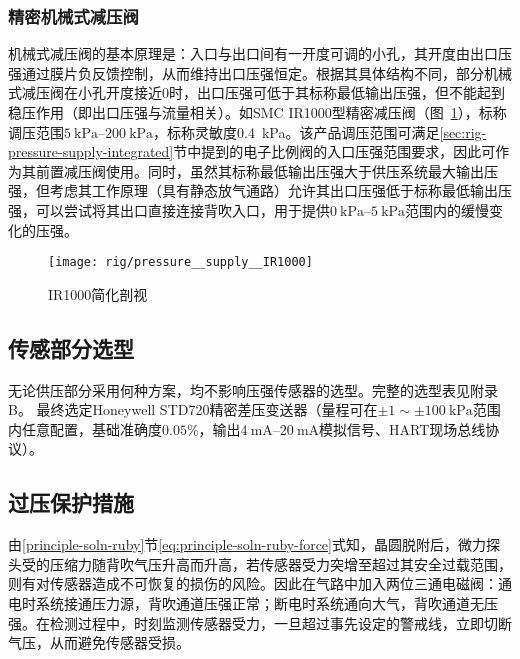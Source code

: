 \subsubsection{精密机械式减压阀}\label{sec:rig-pressure-supply-reg}

机械式减压阀的基本原理是：入口与出口间有一开度可调的小孔，其开度由出口压强通过膜片负反馈控制，从而维持出口压强恒定。根据其具体结构不同，部分机械式减压阀在小孔开度接近0时，出口压强可低于其标称最低输出压强，但不能起到稳压作用（即出口压强与流量相关）。如SMC IR1000型精密减压阀（图~\ref{fig:rig-pressure-supply-ir1000}），标称调压范围$\SIrange{5}{200}{\kPa}$，标称灵敏度\SI{0.4}{\kPa}。该产品调压范围可满足\ref{sec:rig-pressure-supply-integrated}节中提到的电子比例阀的入口压强范围要求，因此可作为其前置减压阀使用。同时，虽然其标称最低输出压强大于供压系统最大输出压强，但考虑其工作原理（具有静态放气通路）允许其出口压强低于标称最低输出压强，可以尝试将其出口直接连接背吹入口，用于提供$\SIrange{0}{5}{\kPa}$范围内的缓慢变化的压强。

\begin{figure}[p]
\centering
\texttt{[image: rig/pressure\_\_supply\_\_IR1000]}
\caption{IR1000简化剖视}
\label{fig:rig-pressure-supply-ir1000}
\end{figure}


\subsection{传感部分选型}\label{sec:rig-pressure-sensor}

无论供压部分采用何种方案，均不影响压强传感器的选型。完整的选型表见附录B。
最终选定Honeywell STD720精密差压变送器（量程可在$\pm \num{1} \sim \pm \SI{100}{\kPa}$范围内任意配置，基础准确度$0.05\%$，输出$\SIrange{4}{20}{\mA}$模拟信号、HART现场总线协议）。


\subsection{过压保护措施}\label{sec:rig-pressure-valve}

由\ref{principle-soln-ruby}节\eqref{eq:principle-soln-ruby-force}式知，晶圆脱附后，微力探头受的压缩力随背吹气压升高而升高，若传感器受力突增至超过其安全过载范围，则有对传感器造成不可恢复的损伤的风险。因此在气路中加入两位三通电磁阀：通电时系统接通压力源，背吹通道压强正常；断电时系统通向大气，背吹通道无压强。在检测过程中，时刻监测传感器受力，一旦超过事先设定的警戒线，立即切断气压，从而避免传感器受损。



